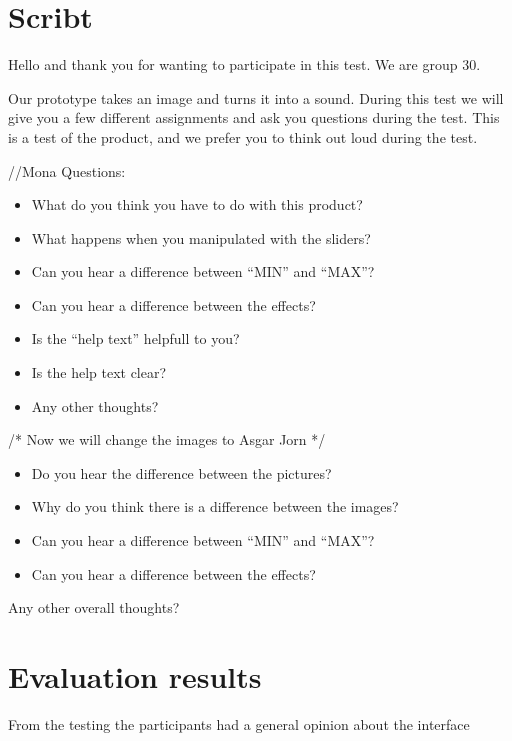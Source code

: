 \section{Scribt}

Hello and thank you for wanting to participate in this test. We are group 30.

Our prototype takes an image and turns it into a sound. During this test we will give you a few different assignments and ask you questions during the test. This is a test of the product, and we prefer you to think out loud during the test.

//Mona
Questions: 


\begin{itemize}
\item What do you think you have to do with this product?
\item What happens when you manipulated with the sliders?
\item Can you hear a difference between “MIN” and “MAX”?
\item Can you hear a difference between the effects?
\item Is the “help text” helpfull to you?
\item Is the help text clear?
\item Any other thoughts?
\end{itemize}



/* Now we will change the images to Asgar Jorn */
\begin{itemize}
\item Do you hear the difference between the pictures?
\item Why do you think there is a difference between the images?
\item Can you hear a difference between “MIN” and “MAX”?
\item Can you hear a difference between the effects?
\end{itemize}


Any other overall thoughts?


\section{Evaluation results}

From the testing the participants had a general opinion about the interface

